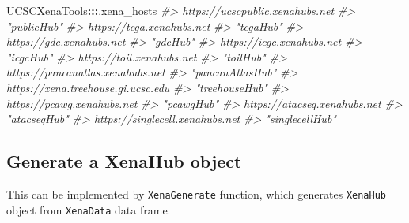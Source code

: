 \documentclass[nofonts,]{tufte-handout}
\newenvironment{Shaded}{\begin{snugshade}}{\end{snugshade}}
\newcommand{\CommentTok}[1]{\textcolor[rgb]{0.56,0.35,0.01}{\textit{#1}}}
\newcommand{\NormalTok}[1]{#1}
\newcommand{\OperatorTok}[1]{\textcolor[rgb]{0.81,0.36,0.00}{\textbf{#1}}}
\begin{document}
\begin{Shaded}
\begin{Highlighting}[]
\NormalTok{UCSCXenaTools}\OperatorTok{:::}\NormalTok{.xena_hosts}
\CommentTok{#>    https://ucscpublic.xenahubs.net }
\CommentTok{#>                        "publicHub" }
\CommentTok{#>          https://tcga.xenahubs.net }
\CommentTok{#>                          "tcgaHub" }
\CommentTok{#>           https://gdc.xenahubs.net }
\CommentTok{#>                           "gdcHub" }
\CommentTok{#>          https://icgc.xenahubs.net }
\CommentTok{#>                          "icgcHub" }
\CommentTok{#>          https://toil.xenahubs.net }
\CommentTok{#>                          "toilHub" }
\CommentTok{#>   https://pancanatlas.xenahubs.net }
\CommentTok{#>                   "pancanAtlasHub" }
\CommentTok{#> https://xena.treehouse.gi.ucsc.edu }
\CommentTok{#>                     "treehouseHub" }
\CommentTok{#>         https://pcawg.xenahubs.net }
\CommentTok{#>                         "pcawgHub" }
\CommentTok{#>       https://atacseq.xenahubs.net }
\CommentTok{#>                       "atacseqHub" }
\CommentTok{#>    https://singlecell.xenahubs.net }
\CommentTok{#>                    "singlecellHub"}
\end{Highlighting}
\end{Shaded}

\hypertarget{generate-a-xenahub-object}{%
\subsection{Generate a XenaHub object}\label{generate-a-xenahub-object}}

This can be implemented by \texttt{XenaGenerate} function, which
generates \texttt{XenaHub} object from \texttt{XenaData} data frame.
\end{document}
